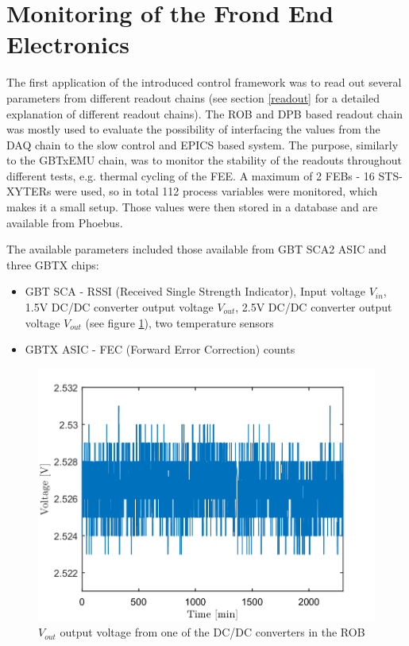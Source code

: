 \section{Monitoring of the Frond End Electronics}
The first application of the introduced control framework was to read out several parameters from different readout chains (see section \ref{readout} for a detailed explanation of different readout chains). The \gls{ROB} and \gls{DPB} based readout chain was mostly used to evaluate the possibility of interfacing the values from the \gls{DAQ} chain to the slow control and \gls{EPICS} based system. The purpose, similarly to the GBTxEMU chain, was to monitor the stability of the readouts throughout different tests, e.g. thermal cycling of the \gls{FEE}. A maximum of 2 FEBs - 16 STS-XYTERs were used, so in total 112 process variables were monitored, which makes it a small setup. Those values were then stored in a database and are available from Phoebus. 

The available parameters included those available from \gls{GBT} \gls{SCA2} \gls{ASIC} \cite{GBT_SCA_ASIC} and three GBTX chips: 
\begin{itemize}
    \item GBT SCA - RSSI (Received Single Strength Indicator), Input voltage $V_{in}$, 1.5V DC/DC converter output voltage $V_{out}$, 2.5V DC/DC converter output voltage $V_{out}$ (see figure \ref{fig:ROB}), two temperature sensors
    \item GBTX \gls{ASIC} - FEC (Forward Error Correction) counts
\end{itemize}

\begin{figure}[!h]
    \centering
    \includegraphics[width=0.65\columnwidth]{Chapter4/images/ROB.png}
    \caption{$V_{out}$ output voltage from one of the DC/DC converters in the \gls{ROB}}
    \label{fig:ROB}
\end{figure}

